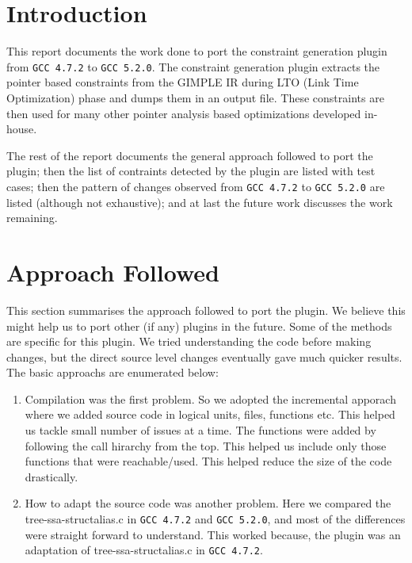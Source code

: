 \section{Introduction}
This report documents the work done to port the constraint generation plugin from
\verb+GCC 4.7.2+ to \verb+GCC 5.2.0+. The constraint generation plugin extracts the pointer based constraints from the GIMPLE IR during LTO (Link Time Optimization) phase and dumps them in an output file. These constraints are then used for many other pointer analysis based optimizations developed in-house.

The rest of the report documents the general approach followed to port the plugin; then the list of contraints detected by the plugin are listed with test cases; then the  pattern of changes observed from \verb+GCC 4.7.2+ to \verb+GCC 5.2.0+ are listed (although not exhaustive); and at last the future work discusses the work remaining.
\section{Approach Followed}\label{sec:appoach-followed}
This section summarises the approach followed to port the plugin. We believe this might help us to port other (if any) plugins in the future. Some of the methods are specific for this plugin. We tried understanding the code before making changes, but the direct source level changes eventually gave much quicker results. The  basic approachs are enumerated below:

\begin{enumerate}
    \item Compilation was the first problem. So we adopted the incremental apporach where we added source code in logical units, files, functions etc. This helped us tackle small number of issues at a time. The functions were added by following the call hirarchy from the top. This helped us include only those functions that were reachable/used. This helped reduce the size of the code drastically.

    \item How to adapt the source code was another problem. Here we compared the tree-ssa-structalias.c in \verb+GCC 4.7.2+ and \verb+GCC 5.2.0+, and most of the differences were straight forward to understand. This worked because, the plugin was an adaptation of tree-ssa-structalias.c in \verb+GCC 4.7.2+.
\end{enumerate}

